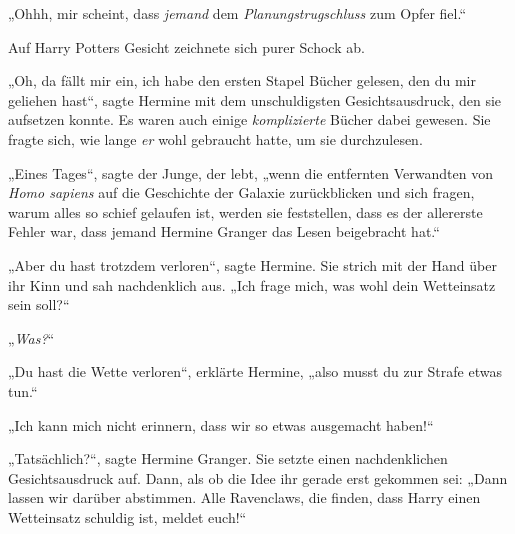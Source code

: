 „Ohhh, mir scheint, dass \emph{jemand} dem \emph{Planungstrugschluss} zum Opfer fiel.“

Auf Harry Potters Gesicht zeichnete sich purer Schock ab.

„Oh, da fällt mir ein, ich habe den ersten Stapel Bücher gelesen, den du mir geliehen hast“, sagte Hermine mit dem unschuldigsten Gesichtsausdruck, den sie aufsetzen konnte. Es waren auch einige \emph{komplizierte} Bücher dabei gewesen. Sie fragte sich, wie lange \emph{er} wohl gebraucht hatte, um sie durchzulesen.

„Eines Tages“, sagte der Junge, der lebt, „wenn die entfernten Verwandten von \emph{Homo sapiens} auf die Geschichte der Galaxie zurückblicken und sich fragen, warum alles so schief gelaufen ist, werden sie feststellen, dass es der allererste Fehler war, dass jemand Hermine Granger das Lesen beigebracht hat.“

„Aber du hast trotzdem verloren“, sagte Hermine. Sie strich mit der Hand über ihr Kinn und sah nachdenklich aus. „Ich frage mich, was wohl dein Wetteinsatz sein soll?“

„\emph{Was?}“

„Du hast die Wette verloren“, erklärte Hermine, „also musst du zur Strafe etwas tun.“

„Ich kann mich nicht erinnern, dass wir so etwas ausgemacht haben!“

„Tatsächlich?“, sagte Hermine Granger. Sie setzte einen nachdenklichen Gesichtsausdruck auf. Dann, als ob die Idee ihr gerade erst gekommen sei: „Dann lassen wir darüber abstimmen. Alle Ravenclaws, die finden, dass Harry einen Wetteinsatz schuldig ist, meldet euch!“

